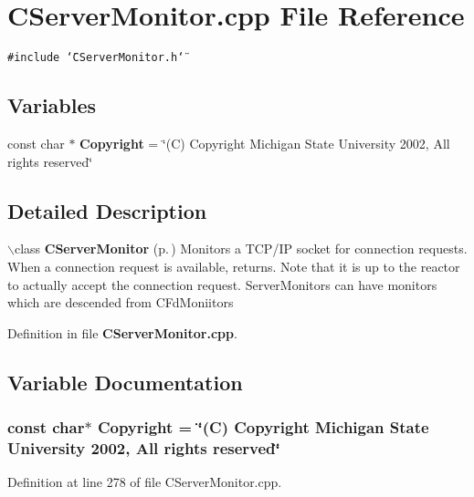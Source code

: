 \section{CServer\-Monitor.cpp File Reference}
\label{CServerMonitor_8cpp}
{\tt \#include \char`\"{}CServer\-Monitor.h\char`\"{}}\par
\subsection*{Variables}
\begin{CompactItemize}
\item 
const char $\ast$ {\bf Copyright} = \char`\"{}(C) Copyright Michigan State University 2002, All rights reserved\char`\"{}
\end{CompactItemize}


\subsection{Detailed Description}


$\backslash$class {\bf CServer\-Monitor} {\rm (p.\,\pageref{classCServerMonitor})}  Monitors a TCP/IP socket for connection requests. When a connection request is available, returns. Note that it is up to the reactor to actually accept the connection request. Server\-Monitors can have monitors which are descended from CFd\-Moniitors



Definition in file {\bf CServer\-Monitor.cpp}.

\subsection{Variable Documentation}
\subsubsection{\setlength{\rightskip}{0pt plus 5cm}const char$\ast$ Copyright = \char`\"{}(C) Copyright Michigan State University 2002, All rights reserved\char`\"{}\hspace{0.3cm}{\tt  [static]}}\label{CServerMonitor_8cpp_a0}




Definition at line 278 of file CServer\-Monitor.cpp.